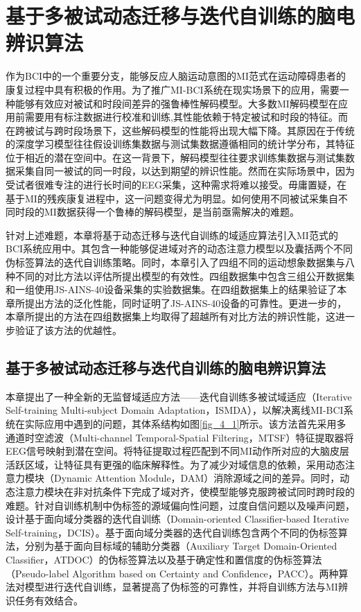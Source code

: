 
\chapter{基于多被试动态迁移与迭代自训练的脑电辨识算法}
作为BCI中的一个重要分支，能够反应人脑运动意图的MI范式在运动障碍患者的康复过程中具有积极的作用。为了推广MI-BCI系统在现实场景下的应用，需要一种能够有效应对被试和时段间差异的强鲁棒性解码模型。大多数MI解码模型在应用前需要用有标注数据进行校准和训练,其性能依赖于特定被试和时段的特征。而在跨被试与跨时段场景下，这些解码模型的性能将出现大幅下降。其原因在于传统的深度学习模型往往假设训练集数据与测试集数据遵循相同的统计学分布，其特征位于相近的潜在空间中。在这一背景下，解码模型往往要求训练集数据与测试集数据采集自同一被试的同一时段，以达到期望的辨识性能。然而在实际场景中，因为受试者很难专注的进行长时间的EEG采集，这种需求将难以接受。毋庸置疑，在基于MI的残疾康复进程中，这一问题变得尤为明显。如何使用不同被试采集自不同时段的MI数据获得一个鲁棒的解码模型，是当前亟需解决的难题。

针对上述难题，本章将基于动态迁移与迭代自训练的域适应算法引入MI范式的BCI系统应用中。其包含一种能够促进域对齐的动态注意力模型以及囊括两个不同伪标签算法的迭代自训练策略。同时，本章引入了四组不同的运动想象数据集与八种不同的对比方法以评估所提出模型的有效性。四组数据集中包含三组公开数据集和一组使用JS-AINS-40设备采集的实验数据集。在四组数据集上的结果验证了本章所提出方法的泛化性能，同时证明了JS-AINS-40设备的可靠性。更进一步的，本章所提出的方法在四组数据集上均取得了超越所有对比方法的辨识性能，这进一步验证了该方法的优越性。


\section{基于多被试动态迁移与迭代自训练的脑电辨识算法}

本章提出了一种全新的无监督域适应方法——迭代自训练多被试域适应（Iterative Self-training Multi-subject Domain Adaptation，ISMDA），以解决离线MI-BCI系统在实际应用中遇到的问题，其体系结构如图\ref{fig_4_1}所示。该方法首先采用多通道时空滤波（Multi-channel Temporal-Spatial Filtering，MTSF）特征提取器将EEG信号映射到潜在空间。将特征提取过程匹配到不同MI动作所对应的大脑皮层活跃区域，让特征具有更强的临床解释性。为了减少对域信息的依赖，采用动态注意力模块（Dynamic Attention Module，DAM）消除源域之间的差异。同时，动态注意力模块在非对抗条件下完成了域对齐，使模型能够克服跨被试同时跨时段的难题。针对自训练机制中伪标签的源域偏向性问题，过度自信问题以及噪声问题，设计基于面向域分类器的迭代自训练（Domain-oriented Classifier-based Iterative Self-training，DCIS）。基于面向域分类器的迭代自训练包含两个不同的伪标签算法，分别为基于面向目标域的辅助分类器（Auxiliary Target Domain-Oriented Classifier，ATDOC）的伪标签算法以及基于确定性和置信度的伪标签算法（Pseudo-label Algorithm based on Certainty and Confidence，PACC）。两种算法对模型进行迭代自训练，显著提高了伪标签的可靠性，并将自训练方法与MI辨识任务有效结合。

